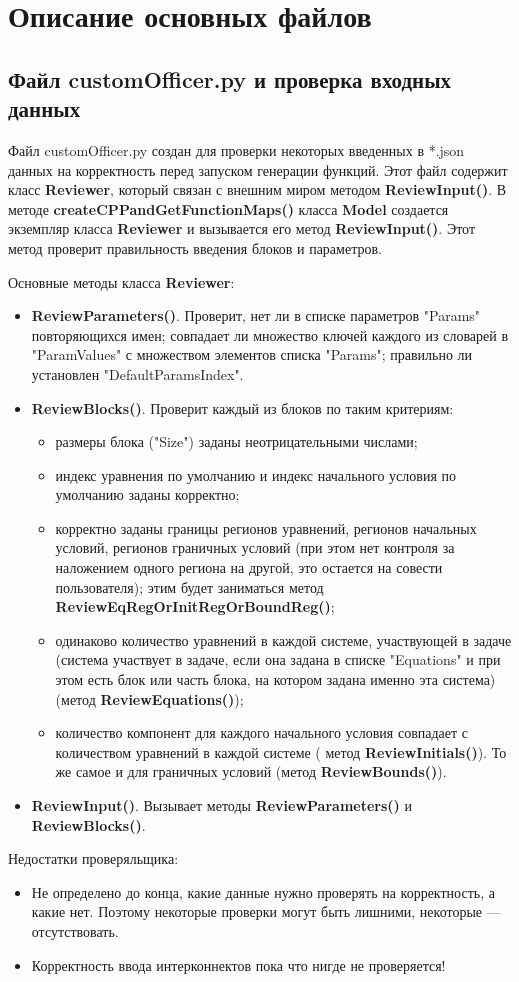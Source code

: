 \documentclass[a4paper]{article}
\begin{document}
\newpage
\section{\LARGE{Описание основных файлов}}
\subsection{\Large Файл customOfficer.py и проверка входных данных}
Файл customOfficer.py создан для проверки некоторых введенных в *.json данных на корректность перед запуском генерации функций. Этот файл содержит класс {\bf Reviewer}, который связан с внешним миром методом {\bf ReviewInput()}. В методе {\bf createCPPandGetFunctionMaps()} класса {\bf Model} создается экземпляр класса {\bf Reviewer} и вызывается его метод {\bf ReviewInput()}. Этот метод проверит правильность введения бло\-ков и параметров.

Основные методы класса {\bf Reviewer}:
\begin{itemize}
\item {\bf ReviewParameters()}. Проверит, нет ли в списке параметров "Pa\-rams" повторяющихся имен; совпадает ли множество ключей каждого из словарей в "ParamValues" с множеством элементов списка "Params"; правильно ли установлен "DefaultParamsIndex".
\item {\bf ReviewBlocks()}. Проверит каждый из блоков по таким критериям: 
	\begin{itemize}
	\item размеры блока ("Size") заданы неотрицательными числами;
	\item индекс уравнения по умолчанию и индекс начального условия по умолчанию заданы корректно;
	\item корректно заданы границы регионов уравнений, регионов на\-чаль\-ных условий, регионов граничных условий (при этом нет контроля за наложением одного региона на 	другой, это остается на совести пользователя); этим будет заниматься метод {\bf Re\-vi\-ew\-Eq\-Reg\-Or\-In\-it\-Reg\-Or\-Bo\-und\-Reg()};
	\item одинаково количество уравнений в каждой системе, участвующей в задаче (система участвует в задаче, если она задана в списке "Equations" и при этом есть блок или часть блока, на котором задана именно эта система) (метод {\bf ReviewEquations()});
	\item количество компонент для каждого начального условия совпадает с количеством уравнений в каждой системе ( метод {\bf ReviewInitials()}). То же самое и для граничных условий (метод {\bf ReviewBounds()}).
	\end{itemize}
\item {\bf ReviewInput()}. Вызывает методы {\bf ReviewParameters()} и {\bf ReviewBlocks()}.
\end{itemize}
Недостатки проверяльщика:
\begin{itemize}
\item Не определено до конца, какие данные нужно проверять на корректность, а какие нет. Поэтому некоторые проверки могут быть лишними, некоторые --- отсутствовать.
\item Корректность ввода интерконнектов пока что нигде не проверяется!
\end{itemize}
\end{document}
